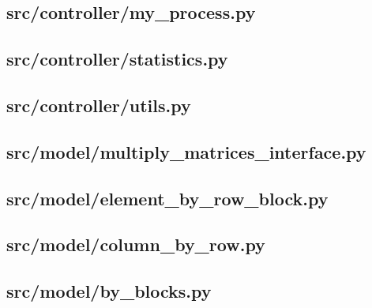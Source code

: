 \subsection{src/controller/my\_process.py}
	
	\newpage

\subsection{src/controller/statistics.py}
	
	\newpage

\subsection{src/controller/utils.py}
	
	\newpage

\subsection{src/model/multiply\_matrices\_interface.py}
	
	\newpage

\subsection{src/model/element\_by\_row\_block.py}
	
	\newpage

\subsection{src/model/column\_by\_row.py}
	
	\newpage

\subsection{src/model/by\_blocks.py}
	
	\newpage

